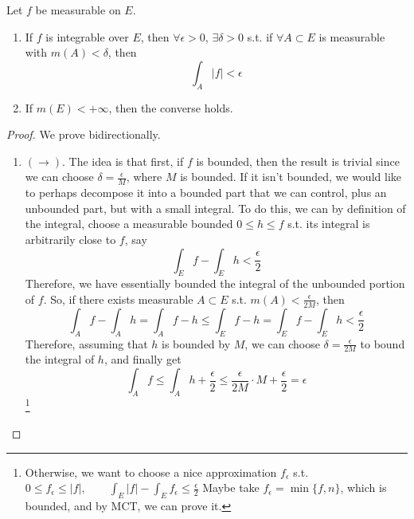   \begin{theorem}
    \label{thm:conditions-for-integrability}
    Let $f$ be measurable on $E$. 
    \begin{enumerate}
      \item If $f$ is integrable over $E$, then $\forall \epsilon > 0$, $\exists \delta > 0$ s.t. if $\forall A \subset E$ is measurable with $m(A) < \delta$, then 
      \begin{equation}
        \int_A |f| < \epsilon
      \end{equation}

      \item If $m(E) < +\infty$, then the converse holds. 
    \end{enumerate}
  \end{theorem}
  \begin{proof}
    We prove bidirectionally. 
    \begin{enumerate}
      \item $(\rightarrow)$. The idea is that first, if $f$ is bounded, then the result is trivial since we can choose $\delta = \frac{\epsilon}{M}$, where $M$ is bounded. If it isn't bounded, we would like to perhaps decompose it into a bounded part that we can control, plus an unbounded part, but with a small integral. To do this, we can by definition of the integral, choose a measurable bounded $0 \leq h \leq f$ s.t. its integral is arbitrarily close to $f$, say 
      \begin{equation}
        \int_E f - \int_E h < \frac{\epsilon}{2}
      \end{equation}
      Therefore, we have essentially bounded the integral of the unbounded portion of $f$. So, if there exists measurable $A \subset E$ s.t. $m(A) < \frac{\epsilon}{2M}$, then 
      \begin{equation}
        \int_A f - \int_A h = \int_A f - h \leq \int_E f - h = \int_E f - \int_E h < \frac{\epsilon}{2}
      \end{equation}
      Therefore, assuming that $h$ is bounded by $M$, we can choose $\delta = \frac{\epsilon}{2M}$ to bound the integral of $h$, and finally get 
      \begin{equation}
        \int_A f \leq \int_A h + \frac{\epsilon}{2} \leq \frac{\epsilon}{2M} \cdot M + \frac{\epsilon}{2} = \epsilon
      \end{equation}
      \footnote{Otherwise, we want to choose a nice approximation $f_\epsilon$ s.t. $0 \leq f_\epsilon \leq |f|, \qquad \int_E |f| - \int_E f_\epsilon \leq \frac{\epsilon}{2}$ Maybe take $f_\epsilon = \min\{f, n\}$, which is bounded, and by MCT, we can prove it. }


\end{enumerate}
\end{proof}

